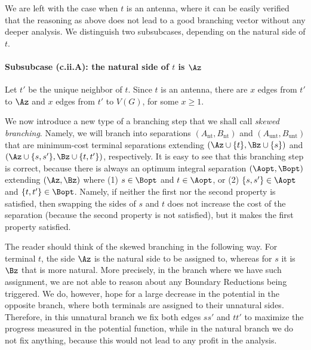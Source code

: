 We are left with the case when $t$ is an antenna, where it can be easily verified that the reasoning as above does not lead to a good branching vector without any deeper analysis. We distinguish two subsubcases, depending on the natural side of $t$.





\paragraph*{Subsubcase (c.ii.A): the natural side of $t$ is $\Az$}

Let $t'$ be the unique neighbor of $t$. Since $t$ is an antenna, there are $x$ edges from $t'$ to $\Az$ and $x$ edges from $t'$ to $V(G)$, for some $x\geq 1$.

\newcommand{\Ant}{A_{\text{nt}}}
\newcommand{\Bnt}{B_{\text{nt}}}
\newcommand{\Aunt}{A_{\text{unt}}}
\newcommand{\Bunt}{B_{\text{unt}}}
\newcommand{\Auntext}{A_{\text{unt}}^{\text{ext}}}
\newcommand{\Buntext}{B_{\text{unt}}^{\text{ext}}}

We now introduce a new type of a branching step that we shall call {\em{skewed branching}}. Namely, we will branch into separations $(\Ant,\Bnt)$ and $(\Aunt,\Bunt)$ that are minimum-cost terminal separations extending $(\Az\cup \{t\},\Bz\cup \{s\})$ and $(\Az\cup \{s,s'\},\Bz\cup \{t,t'\})$, respectively. It is easy to see that this branching step is correct, because there is always an optimum integral separation $(\Aopt,\Bopt)$ extending $(\Az,\Bz)$ where (1) $s\in \Bopt$ and $t\in \Aopt$, or (2) $\{s,s'\}\in \Aopt$ and $\{t,t'\}\in \Bopt$. Namely, if neither the first nor the second property is satisfied, then swapping the sides of $s$ and $t$ does not increase the cost of the separation (because the second property is not satisfied), but it makes the first property satisfied.

The reader should think of the skewed branching in the following way. For terminal $t$, the side $\Az$ is the natural side to be assigned to, whereas for $s$ it is $\Bz$ that is more natural. More precisely, in the branch where we have such assignment, we are not able to reason about any Boundary Reductions being triggered. We do, however, hope for a large decrease in the potential in the opposite branch, where both terminals are assigned to their unnatural sides. Therefore, in this unnatural branch we fix both edges $ss'$ and $tt'$ to maximize the progress measured in the potential function, while in the natural branch we do not fix anything, because this would not lead to any profit in the analysis.

